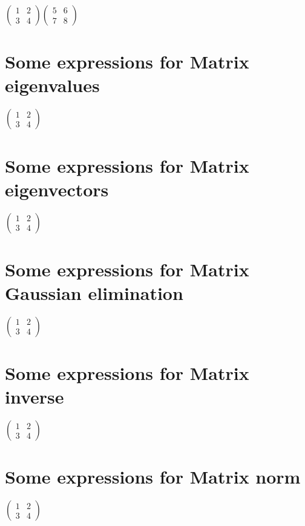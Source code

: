 \documentclass{article}
\begin{document}
$\left( 
\begin{array}{cc}
1 & 2 \\ 
3 & 4%
\end{array}%
\right) \left( 
\begin{array}{cc}
5 & 6 \\ 
7 & 8%
\end{array}%
\right) $

\section{Some expressions for Matrix eigenvalues}

$\left( 
\begin{array}{cc}
1 & 2 \\ 
3 & 4%
\end{array}%
\right) $

\section{Some expressions for Matrix eigenvectors}

$\left( 
\begin{array}{cc}
1 & 2 \\ 
3 & 4%
\end{array}%
\right) $

\section{Some expressions for Matrix Gaussian elimination}

$\left( 
\begin{array}{cc}
1 & 2 \\ 
3 & 4%
\end{array}%
\right) $

\section{Some expressions for Matrix inverse}

$\left( 
\begin{array}{cc}
1 & 2 \\ 
3 & 4%
\end{array}%
\right) $

\section{Some expressions for Matrix norm}

$\left( 
\begin{array}{cc}
1 & 2 \\ 
3 & 4%
\end{array}%
\right) $
\end{document}
